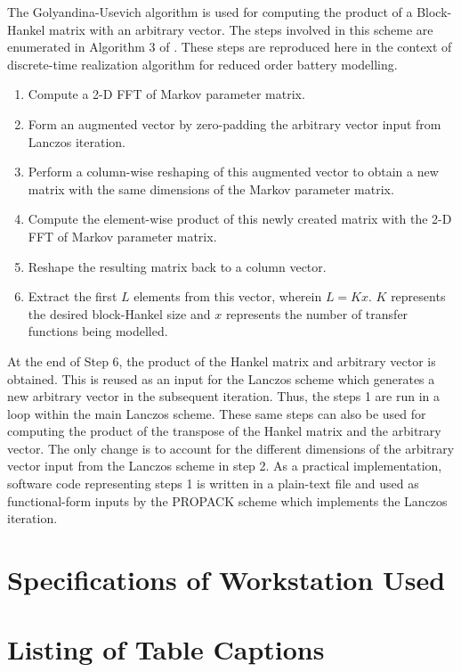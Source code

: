 The Golyandina-Usevich algorithm is used for computing the product
of a Block-Hankel matrix with an arbitrary vector. The steps involved
in this scheme are enumerated in Algorithm 3 of \cite{GolyandinaKorobeynikovShlemovEtAl2015}.
These steps are reproduced here in the context of discrete-time realization
algorithm for reduced order battery modelling.
\begin{enumerate}
	\item Compute a 2-D FFT of Markov parameter matrix.
	\item Form an augmented vector by zero-padding the arbitrary vector input
	from Lanczos iteration.
	\item Perform a column-wise reshaping of this augmented vector to obtain
	a new matrix with the same dimensions of the Markov parameter matrix.
	\item Compute the element-wise product of this newly created matrix with
	the 2-D FFT of Markov parameter matrix.
	\item Reshape the resulting matrix back to a column vector.
	\item Extract the first $L$ elements from this vector, wherein $L=Kx$.
	$K$ represents the desired block-Hankel size and $x$ represents
	the number of transfer functions being modelled.
\end{enumerate}
At the end of Step 6, the product of the Hankel matrix and arbitrary
vector is obtained. This is reused as an input for the Lanczos scheme
which generates a new arbitrary vector in the subsequent iteration.
Thus, the steps 1 are run in a loop within the main Lanczos
scheme. These same steps can also be used for computing the product
of the transpose of the Hankel matrix and the arbitrary vector. The
only change is to account for the different dimensions of the arbitrary
vector input from the Lanczos scheme in step 2. As a practical implementation,
software code representing steps 1 is written in a plain-text
file and used as functional-form inputs by the PROPACK scheme which
implements the Lanczos iteration.

\singlespacing
\section{Specifications of Workstation Used\label{sec:Specifications-of-Workstation}}

\newpage
\section*{Listing of Table Captions}

